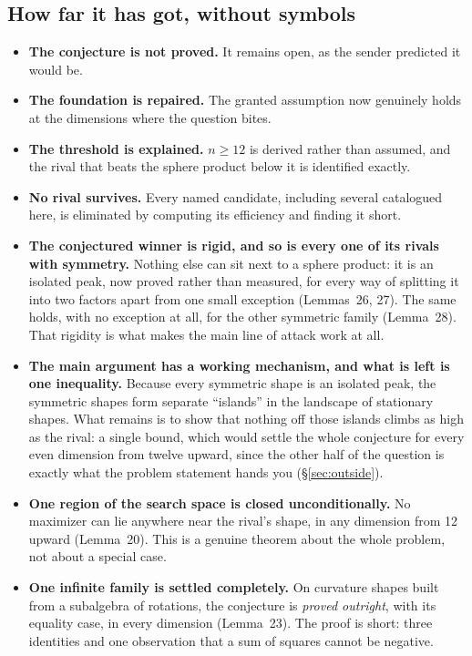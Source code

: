 \subsection{How far it has got, without symbols}

\begin{itemize}[leftmargin=1.4em]
\item \textbf{The conjecture is not proved.} It remains open, as the sender predicted it would be.
\item \textbf{The foundation is repaired.} The granted assumption now genuinely holds at the dimensions where the question bites.
\item \textbf{The threshold is explained.} $n\ge12$ is derived rather than assumed, and the rival that beats the sphere product below it is identified exactly.
\item \textbf{No rival survives.} Every named candidate, including several catalogued here, is eliminated by computing its efficiency and finding it short.
\item \textbf{The conjectured winner is rigid, and so is every one of its rivals with symmetry.} Nothing else can sit next to a sphere product: it is an isolated peak, now proved rather than measured, for every way of splitting it into two factors apart from one small exception (Lemmas~26, 27). The same holds, with no exception at all, for the other symmetric family (Lemma~28). That rigidity is what makes the main line of attack work at all.
\item \textbf{The main argument has a working mechanism, and what is left is one inequality.} Because every symmetric shape is an isolated peak, the symmetric shapes form separate ``islands'' in the landscape of stationary shapes. What remains is to show that nothing off those islands climbs as high as the rival: a single bound, which would settle the whole conjecture for every even dimension from twelve upward, since the other half of the question is exactly what the problem statement hands you (\S\ref{sec:outside}).
\item \textbf{One region of the search space is closed unconditionally.} No maximizer can lie anywhere near the rival's shape, in any dimension from 12 upward (Lemma~20). This is a genuine theorem about the whole problem, not about a special case.
\item \textbf{One infinite family is settled completely.} On curvature shapes built from a subalgebra of rotations, the conjecture is \emph{proved outright}, with its equality case, in every dimension (Lemma~23). The proof is short: three identities and one observation that a sum of squares cannot be negative.

\end{itemize}
